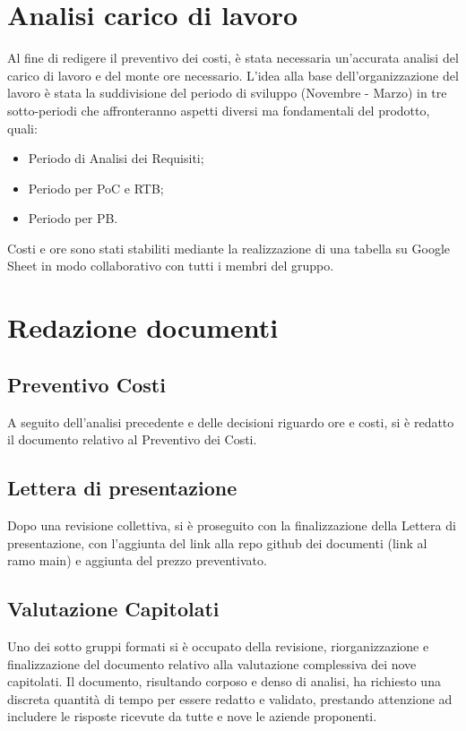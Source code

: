 \documentclass[12pt,a4paper]{article}
\begin{document}
\section{Analisi carico di lavoro}
Al fine di redigere il preventivo dei costi, è stata necessaria un'accurata analisi del carico di lavoro e del monte ore necessario. L'idea alla base dell'organizzazione del lavoro è stata la suddivisione del periodo di sviluppo (Novembre - Marzo) in tre sotto-periodi che affronteranno aspetti diversi ma fondamentali del prodotto, quali:
\begin{itemize}
    \item Periodo di Analisi dei Requisiti;
    \item Periodo per PoC e RTB;
    \item Periodo per PB.
\end{itemize}

Costi e ore sono stati stabiliti mediante la realizzazione di una tabella su Google Sheet in modo collaborativo con tutti i membri del gruppo.  

\section{Redazione documenti}
\subsection{Preventivo Costi}
A seguito dell'analisi precedente e delle decisioni riguardo ore e costi, si è redatto il documento relativo al Preventivo dei Costi.

\subsection{Lettera di presentazione}
Dopo una revisione collettiva, si è proseguito con la finalizzazione della Lettera di presentazione, con l'aggiunta del link alla repo github dei documenti (link al ramo main) e aggiunta del prezzo preventivato.

\subsection{Valutazione Capitolati}
Uno dei sotto gruppi formati si è occupato della revisione, riorganizzazione e finalizzazione del documento relativo alla valutazione complessiva dei nove capitolati. Il documento, risultando corposo e denso di analisi, ha richiesto una discreta quantità di tempo per essere redatto e validato, prestando attenzione ad includere le risposte ricevute da tutte e nove le aziende proponenti.
\end{document}
